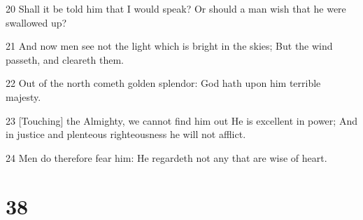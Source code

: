 \par 20 Shall it be told him that I would speak? Or should a man wish that he were swallowed up?
\par 21 And now men see not the light which is bright in the skies; But the wind passeth, and cleareth them.
\par 22 Out of the north cometh golden splendor: God hath upon him terrible majesty.
\par 23 [Touching] the Almighty, we cannot find him out He is excellent in power; And in justice and plenteous righteousness he will not afflict.
\par 24 Men do therefore fear him: He regardeth not any that are wise of heart.

\chapter{38}

